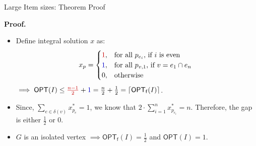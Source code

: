 \documentclass[xcolor=table]{beamer} %
\newcommand*{\QEDA}{\hfill\ensuremath{\blacksquare}}%
\theoremstyle{definition}
\theoremstyle{plain}
\theoremstyle{remark}
\renewcommand{\a}[1]{\textcolor{dred}{#1}}
\renewcommand{\b}[1]{\textcolor{dblue}{#1}}
\begin{document}
\begin{frame}{Large Item sizes: Theorem Proof}

    \textbf{Proof.} 
    
    \begin{itemize}
        \item<2->  Define integral solution $x$ as:
            \[
                x_p = \begin{cases}
                \a{1}, & \text{for all $p_{e_i}$, if $i$ is even} \\
                    \b{1}, & \text{for all $p_{v,1}$, if $v = e_1 \cap e_n$ }\\
                    0, & \text{otherwise}
                \end{cases}
            \]
            $\implies \mathsf{OPT}(I) \leq \a{\frac{n-1}{2}} + \b{1} = \frac{n}{2} + \frac{1}{2} = \lceil \mathsf{OPT_f}(I)\rceil$.
        
        \item<3->  Since, $\sum_{e \in \delta(v)} x^*_{p_e} = 1$, we know that $2\cdot \sum_{i=1}^{n} x^*_{p_{e_i}} = n$. Therefore,  the gap is either $\frac{1}{2}$ or $0$.
        
        \item<4->  $G$ is an isolated vertex $\implies \mathsf{OPT_f}(I) = \frac{1}{2}$ and $\mathsf{OPT}(I) = 1$. 
    \end{itemize}
    \onslide<4->{\QEDA}
\end{frame}


    
        
    
\end{document}
